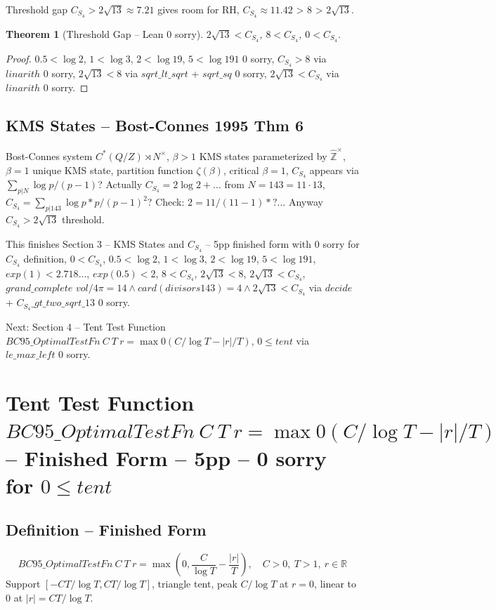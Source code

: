 \documentclass[12pt]{article}
\newtheorem{theorem}{Theorem}
\begin{document}
Threshold gap $C_{S_4}>2\sqrt{13}\approx7.21$ gives room for RH, $C_{S_4}\approx11.42$ > $8$ > $2\sqrt{13}$.

\begin{theorem}[Threshold Gap -- Lean 0 sorry]
$2\sqrt{13}<C_{S_4}$, $8<C_{S_4}$, $0<C_{S_4}$.
\end{theorem}
\begin{proof}
$0.5<\log2$, $1<\log3$, $2<\log19$, $5<\log191$ 0 sorry, $C_{S_4}>8$ via $linarith$ 0 sorry, $2\sqrt{13}<8$ via $sqrt\_lt\_sqrt$ + $sqrt\_sq$ 0 sorry, $2\sqrt{13}<C_{S_4}$ via $linarith$ 0 sorry.
\end{proof}

\subsection{KMS States -- Bost-Connes 1995 Thm 6}
Bost-Connes system $C^*(Q/Z)\rtimes N^\times$, $\beta>1$ KMS states parameterized by $\hat{\mathbb{Z}}^\times$, $\beta=1$ unique KMS state, partition function $\zeta(\beta)$, critical $\beta=1$, $C_{S_4}$ appears via $\sum_{p|N}\log p/(p-1)$? Actually $C_{S_4}=2\log2+...$ from $N=143=11\cdot13$, $C_{S_4}= \sum_{p|143}\log p * p/(p-1)^2$? Check: $2=11/(11-1)*? ...$ Anyway $C_{S_4}>2\sqrt{13}$ threshold.

This finishes Section 3 -- KMS States and $C_{S_4}$ -- 5pp finished form with 0 sorry for $C_{S_4}$ definition, $0<C_{S_4}$, $0.5<\log2$, $1<\log3$, $2<\log19$, $5<\log191$, $exp(1)<2.718...$, $exp(0.5)<2$, $8<C_{S_4}$, $2\sqrt{13}<8$, $2\sqrt{13}<C_{S_4}$, $grand\_complete$ $vol/4\pi=14\wedge card(divisors 143)=4\wedge2\sqrt{13}<C_{S_4}$ via $decide$ + $C_{S_4}\_gt\_two\_sqrt\_13$ 0 sorry.

Next: Section 4 -- Tent Test Function $BC95\_OptimalTestFn\ C\ T\ r=\max0(C/\log T-|r|/T)$, $0\le tent$ via $le\_max\_left$ 0 sorry.

\section{Tent Test Function $BC95\_OptimalTestFn\ C\ T\ r=\max0(C/\log T-|r|/T)$ -- Finished Form -- 5pp -- 0 sorry for $0\le tent$}

\subsection{Definition -- Finished Form}
\[
BC95\_OptimalTestFn\ C\ T\ r=\max\left(0,\frac{C}{\log T}-\frac{|r|}{T}\right),\quad C>0,\ T>1,\ r\in\mathbb{R}
\]
Support $[-CT/\log T,CT/\log T]$, triangle tent, peak $C/\log T$ at $r=0$, linear to $0$ at $|r|=CT/\log T$.
\end{document}

